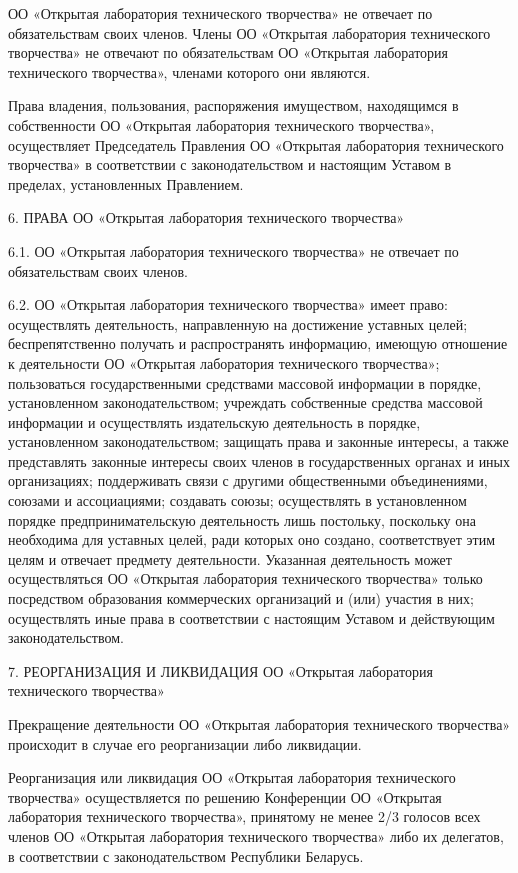 \documentclass[a4paper,14pt,titlepage]{extarticle}
\begin{document}
ОО «Открытая лаборатория технического творчества» не отвечает по обязательствам своих членов. Члены ОО «Открытая
лаборатория технического творчества» не отвечают по обязательствам ОО «Открытая лаборатория технического творчества»,
членами которого они являются.

Права владения, пользования, распоряжения имуществом, находящимся в собственности ОО «Открытая лаборатория технического
творчества», осуществляет Председатель Правления ОО «Открытая лаборатория технического творчества» в соответствии с
законодательством и настоящим Уставом в пределах, установленных Правлением. 

6. ПРАВА ОО «Открытая лаборатория технического творчества»

6.1. ОО «Открытая лаборатория технического творчества» не отвечает по обязательствам своих членов. 

6.2. ОО «Открытая лаборатория технического творчества» имеет право:
осуществлять деятельность, направленную на достижение уставных целей;
беспрепятственно получать и распространять информацию, имеющую отношение к деятельности ОО «Открытая лаборатория
технического творчества»;
пользоваться государственными средствами массовой информации в порядке, установленном законодательством;
учреждать собственные средства массовой информации и осуществлять издательскую деятельность в порядке, установленном
законодательством;
защищать права и законные интересы, а также представлять законные интересы своих членов в государственных органах и иных
организациях;
поддерживать связи с другими общественными объединениями, союзами и ассоциациями;
создавать союзы;
осуществлять в установленном порядке предпринимательскую деятельность лишь постольку, поскольку она необходима для
уставных целей, ради которых оно создано, соответствует этим целям и отвечает предмету деятельности. Указанная
деятельность может осуществляться ОО «Открытая лаборатория технического творчества» только посредством образования
коммерческих организаций и (или) участия в них;
осуществлять иные права в соответствии с настоящим Уставом и действующим законодательством. 

7. РЕОРГАНИЗАЦИЯ И ЛИКВИДАЦИЯ ОО «Открытая лаборатория технического творчества»

Прекращение деятельности ОО «Открытая лаборатория технического творчества» происходит в случае его реорганизации либо
ликвидации. 

Реорганизация или ликвидация ОО «Открытая лаборатория технического творчества» осуществляется по решению Конференции ОО
«Открытая лаборатория технического творчества», принятому не менее 2/3 голосов всех членов ОО «Открытая лаборатория
технического творчества» либо их делегатов, в соответствии с законодательством Республики Беларусь.
\end{document}
